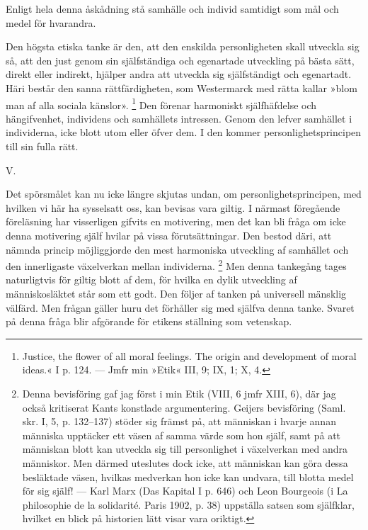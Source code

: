 \documentclass[12pt]{article}
\newcommand{\opage}[1]{\marginnote{\footnotesize\textit{[#1]}}}
\begin{document}
Enligt hela denna åskådning stå samhälle och individ samtidigt som mål och medel för hvarandra.

Den högsta etiska tanke är den, att den enskilda personligheten skall utveckla sig så, att den just genom sin själfständiga och egenartade utveckling på bästa sätt, direkt eller indirekt, hjälper andra att utveckla sig själfständigt och egenartadt. Häri består den sanna rättfärdigheten, som Westermarck med rätta kallar »blom%
\opage{49}
man af alla sociala känslor».%
\footnote[1]{Justice, %
 the flower of all moral feelings. The origin and development of moral ideas.« I p. 124. --- Jmfr min »Etik« III, 9; IX, 1; X, 4.} Den förenar harmoniskt själfhäfdelse och hängifvenhet, individens och samhällets intressen. Genom den lefver samhället i individerna, icke blott utom eller öfver dem. I den kommer personlighetsprincipen till sin fulla rätt. %
\opage{50}
\begin{center}\large V.\end{center}

Det spörsmålet kan nu icke längre skjutas undan, om personlighetsprincipen, med hvilken vi här ha sysselsatt oss, kan bevisas vara giltig. I närmast föregående föreläsning har visserligen gifvits en motivering, men det kan bli fråga om icke denna motivering själf hvilar på vissa förutsättningar. Den bestod däri, att nämnda princip möjliggjorde den mest harmoniska utveckling af samhället och den innerligaste växelverkan mellan individerna. %
\footnote[1]{Denna bevisföring gaf jag först i min Etik (VIII, 6 jmfr XIII, 6), där jag också kritiserat Kants konstlade argumentering. Geijers bevisföring (Saml. skr. I, 5, p. 132--137) stöder sig främst på, att människan i hvarje annan människa upptäcker ett väsen af samma värde som hon själf, samt på att människan blott kan utveckla sig till personlighet i växelverkan med andra människor. Men därmed uteslutes dock icke, att människan kan göra dessa besläktade väsen, hvilkas medverkan hon icke kan undvara, till blotta medel för sig själf! --- Karl Marx (Das Kapital I p. 646) och Leon Bourgeois (i La philosophie de la solidarité. Paris 1902, p. 38) uppställa satsen som själfklar, hvilket en blick på historien lätt visar vara oriktigt.} Men denna tankegång tages %
\opage{51}
naturligtvis för giltig blott af dem, för hvilka en dylik utveckling af människosläktet står som ett godt. Den följer af tanken på universell mänsklig välfärd. Men frågan gäller huru det förhåller sig med själfva denna tanke. Svaret på denna fråga blir afgörande för etikens ställning som vetenskap.
\end{document}
